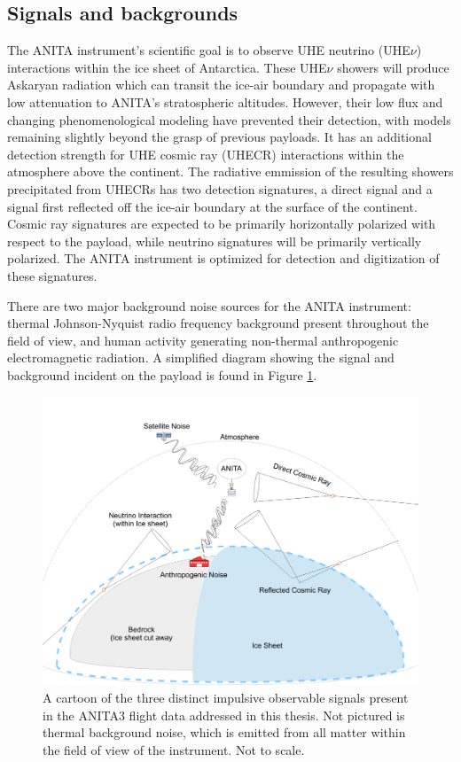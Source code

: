 	\subsection{Signals and backgrounds}
	The ANITA instrument's scientific goal is to observe UHE neutrino (UHE$\nu$) interactions within the ice sheet of Antarctica.  These UHE$\nu$ showers will produce Askaryan radiation which can transit the ice-air boundary and propagate with low attenuation to ANITA's stratospheric altitudes. However, their low flux and changing phenomenological modeling have prevented their detection, with models remaining slightly beyond the grasp of previous payloads.  It has an additional detection strength for UHE cosmic ray (UHECR) interactions within the atmosphere above the continent.  The radiative emmission of the resulting showers precipitated from UHECRs has two detection signatures, a direct signal and a signal first reflected off the ice-air boundary at the surface of the continent.  Cosmic ray signatures are expected to be primarily horizontally polarized with respect to the payload, while neutrino signatures will be primarily vertically polarized.  The ANITA instrument is optimized for detection and digitization of these signatures.
	
	There are two major background noise sources for the ANITA instrument: thermal Johnson-Nyquist radio frequency background present throughout the field of view, and human activity generating non-thermal anthropogenic electromagnetic radiation.  A simplified diagram showing the signal and background incident on the payload is found in Figure \ref{fig:AnitaInFlightObservable}.
	
\begin{figure}
\centering
	\includegraphics[width=\textwidth]{figures/AnitaInFlightObservable2}
	\caption{A cartoon of the three distinct impulsive observable signals present in the ANITA3 flight data addressed in this thesis. Not pictured is thermal background noise, which is emitted from all matter within the field of view of the instrument.  Not to scale. }
	\label{fig:AnitaInFlightObservable}
\end{figure}	
	
